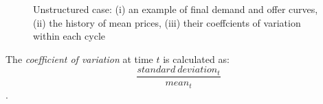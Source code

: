\documentclass[12pt]{report}
\begin{document}
\begin{figure}[htbp]
\begin{center}
\caption{Unstructured case: (i) an example of final demand and offer curves, (ii) the history of mean prices, (iii) their coeffcients of variation within each cycle}
\label{output_4_1.png}
\end{center}
\end{figure}

The \emph{coefficient of variation} at time $t$ is calculated as: $$\frac{standard~deviation_t}{mean_t}$$.
\end{document}
